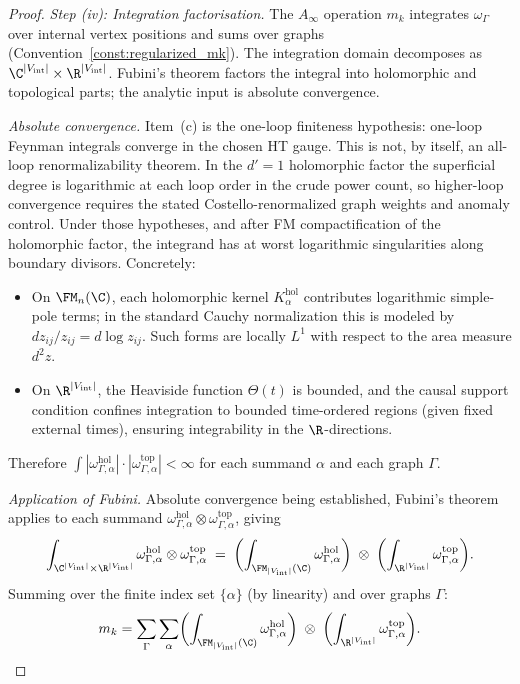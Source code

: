 \begin{proof}
\medskip
\emph{Step (iv): Integration factorisation.}
The $A_\infty$ operation $m_k$ integrates $\omega_\Gamma$ over internal vertex positions and sums over graphs (Convention~\ref{const:regularized_mk}). The integration domain decomposes as $\C^{|V_{\mathrm{int}}|} \times \R^{|V_{\mathrm{int}}|}$. Fubini's theorem factors the integral into holomorphic and topological parts; the analytic input is absolute convergence.

\emph{Absolute convergence.} Item~(c) is the one-loop finiteness
hypothesis: one-loop Feynman integrals converge in the chosen HT gauge.
This is not, by itself, an all-loop renormalizability theorem. In the
$d'=1$ holomorphic factor the superficial degree is logarithmic at
each loop order in the crude power count, so higher-loop convergence
requires the stated Costello-renormalized graph weights and anomaly
control. Under those hypotheses, and after FM compactification of the
holomorphic factor, the integrand has at worst logarithmic
singularities along boundary divisors. Concretely:
\begin{itemize}
\item On $\FM_n(\C)$, each holomorphic kernel $K_{\alpha}^{\mathrm{hol}}$ contributes logarithmic simple-pole terms; in the standard Cauchy normalization this is modeled by $dz_{ij}/z_{ij}=d\log z_{ij}$. Such forms are locally $L^1$ with respect to the area measure $d^2 z$.
\item On $\R^{|V_{\mathrm{int}}|}$, the Heaviside function $\Theta(t)$ is bounded, and the causal support condition confines integration to bounded time-ordered regions (given fixed external times), ensuring integrability in the $\R$-directions.
\end{itemize}
Therefore $\int |\omega_{\Gamma,\alpha}^{\mathrm{hol}}| \cdot |\omega_{\Gamma,\alpha}^{\mathrm{top}}| < \infty$ for each summand $\alpha$ and each graph $\Gamma$.

\emph{Application of Fubini.} Absolute convergence being established, Fubini's theorem applies to each summand $\omega_{\Gamma,\alpha}^{\mathrm{hol}} \otimes \omega_{\Gamma,\alpha}^{\mathrm{top}}$, giving
\[
 \int_{\C^{|V_{\mathrm{int}}|} \times \R^{|V_{\mathrm{int}}|}}
 \omega_{\Gamma,\alpha}^{\mathrm{hol}} \otimes \omega_{\Gamma,\alpha}^{\mathrm{top}}
 \;=\;
 \biggl(\int_{\FM_{|V_{\mathrm{int}}|}(\C)}
 \omega_{\Gamma,\alpha}^{\mathrm{hol}}\biggr)
 \;\otimes\;
 \biggl(\int_{\R^{|V_{\mathrm{int}}|}}
 \omega_{\Gamma,\alpha}^{\mathrm{top}}\biggr).
\]
Summing over the finite index set $\{\alpha\}$ (by linearity) and over graphs $\Gamma$:
\[
 m_k = \sum_\Gamma \sum_\alpha
 \biggl(\int_{\FM_{|V_{\mathrm{int}}|}(\C)}
 \omega_{\Gamma,\alpha}^{\mathrm{hol}}\biggr)
 \;\otimes\;
 \biggl(\int_{\R^{|V_{\mathrm{int}}|}}
 \omega_{\Gamma,\alpha}^{\mathrm{top}}\biggr).
\]


\end{proof}
